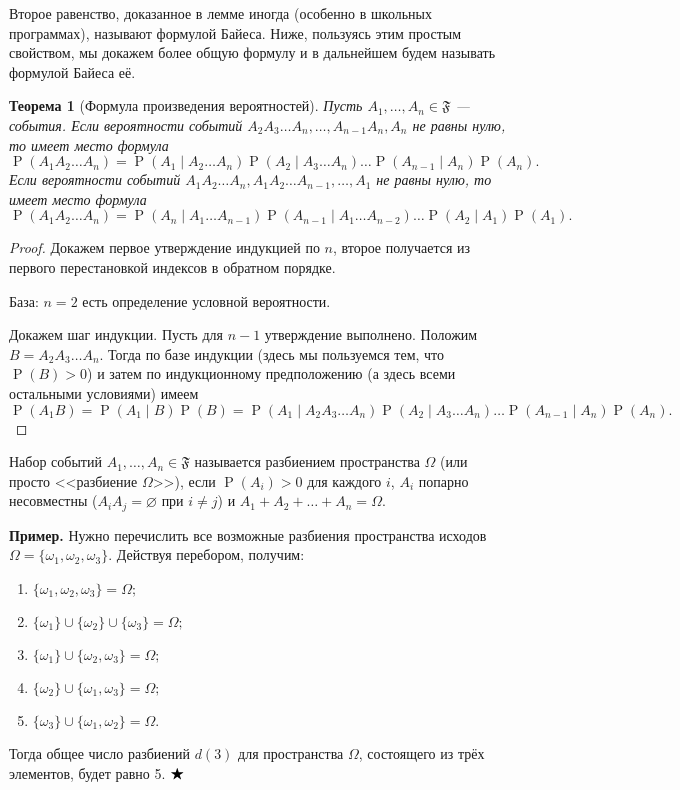 \documentclass[12pt]{article}
\newtheorem{theorem}{Теорема}
\numberwithin{theorem}{section}
\theoremstyle{definition}
\newenvironment{example}{\indent \textbf{Пример.}}{$ \hfill \bigstar $}
\newcommand{\defin}[2]{\hypertarget{#2}{{\color{red} #1}}}
\newcommand{\prob}{\operatorname{P}}
\newcommand{\events}{\mathfrak{F}}
\begin{document}
	Второе равенство, доказанное в лемме иногда (особенно в школьных программах), называют формулой Байеса.
	Ниже, пользуясь этим простым свойством, мы докажем более общую формулу и в дальнейшем будем называть формулой Байеса её.
	
	\begin{theorem}[Формула произведения вероятностей] \label{multiplication law}
		Пусть $ A_1, \ldots, A_n \in \events $ --- события.
		Если вероятности событий $ A_2A_3\ldots A_n, \ldots, A_{n - 1}A_n, A_n $ не равны нулю, то имеет место формула
		$$ \prob(A_1A_2\ldots A_n) = \prob(A_1 \mid A_2 \ldots A_n)\prob(A_2 \mid A_3 \ldots A_n) 
		\ldots \prob(A_{n - 1}\mid A_n)\prob(A_n). $$
		Если вероятности событий $ A_1A_2\ldots A_n, A_1A_2\ldots A_{n - 1}, \ldots, A_1 $ не равны нулю, то имеет место формула
		$$ \prob(A_1A_2\ldots A_n) = \prob(A_n \mid A_1\ldots A_{n-1})\prob(A_{n - 1} \mid A_1 \ldots A_{n - 2}) 
		\ldots \prob(A_{2}\mid A_1)\prob(A_1). $$
	\end{theorem}
	
	\begin{proof}
		Докажем первое утверждение индукцией по $ n $, второе получается из первого перестановкой индексов в обратном порядке.
		
		База: $ n = 2 $ есть определение условной вероятности.
		
		Докажем шаг индукции. Пусть для $ n - 1 $ утверждение выполнено.
		Положим $ B = A_2A_3\ldots A_n $.
		Тогда по базе индукции (здесь мы пользуемся тем, что $ \prob(B) > 0 $) 
		и затем по индукционному предположению (а здесь всеми остальными условиями) имеем
		$$ \prob(A_1B) = \prob(A_1 \mid B)\prob (B) = \prob(A_1 \mid A_2A_3 \ldots A_n)\prob(A_2 \mid A_3 \ldots A_n)
		\ldots \prob(A_{n - 1}\mid A_n)\prob(A_n). $$
	\end{proof}
	
	Набор событий $ A_1, \ldots, A_n \in \events $ называется \defin{разбиением пространства $ \Omega $}{exclusive-exhaustive}
	(или просто <<разбиение $ \Omega $>>),
	если $ \prob(A_i) > 0 $ для каждого $ i $, $ A_i $ попарно несовместны ($ A_iA_j = \varnothing $ при $ i \neq j $)
	и $ {A_1 + A_2 + \ldots + A_n = \Omega} $.
	
	\begin{example}
		Нужно перечислить все возможные разбиения пространства исходов $\Omega = \{\omega_1, \omega_2, \omega_3\}$.  
		Действуя перебором, получим:
		\begin{enumerate}
			\item $\{\omega_1, \omega_2, \omega_3\} = \Omega;$
			\item $\{\omega_1\} \cup \{\omega_2\} \cup \{\omega_3\} = \Omega;$
			\item $\{\omega_1\} \cup \{\omega_2, \omega_3\} = \Omega;$
			\item $\{\omega_2\} \cup \{\omega_1, \omega_3\} = \Omega;$
			\item $\{\omega_3\} \cup \{\omega_1, \omega_2\} = \Omega.$
		\end{enumerate}
		Тогда общее число разбиений $d(3)$ для пространства $\Omega$, состоящего из трёх элементов, будет равно 5.
	\end{example}
	
\end{document}
